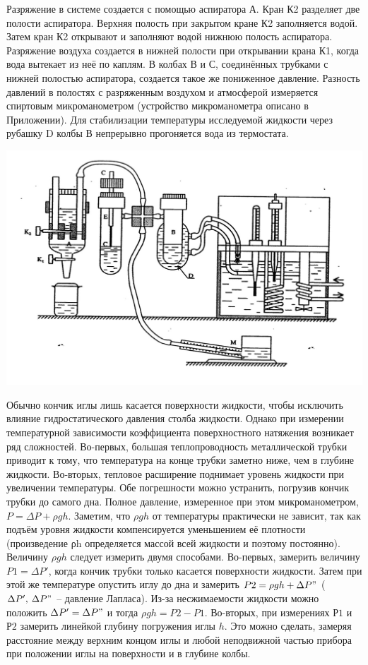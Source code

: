 \bigskip

Разряжение в системе создается с помощью аспиратора А. Кран К2 разделяет две полости аспиратора. Верхняя полость при закрытом кране К2  заполняется водой. Затем кран К2 открывают и заполняют водой  нижнюю полость  аспиратора.  Разряжение воздуха создается в нижней полости  при открывании крана К1, когда  вода вытекает из неё по каплям. В колбах В и С, соединённых трубками с нижней полостью аспиратора,  создается такое же пониженное давление. Разность давлений в полостях с разряженным воздухом и атмосферой измеряется спиртовым микроманометром (устройство микроманометра описано в Приложении). 
Для стабилизации температуры исследуемой жидкости через рубашку D колбы В непрерывно прогоняется вода из термостата.

\includegraphics[width=1\textwidth]{Scheme.jpg}

Обычно кончик иглы лишь касается поверхности жидкости, чтобы исключить влияние гидростатического давления столба жидкости. Однако при измерении температурной зависимости коэффициента поверхностного натяжения возникает ряд сложностей. Во-первых, большая теплопроводность металлической трубки приводит к тому, что температура на конце трубки заметно ниже, чем в глубине жидкости. Во-вторых, тепловое расширение поднимает уровень жидкости при увеличении температуры. 
Обе погрешности можно устранить, погрузив кончик трубки до самого дна. Полное давление, измеренное при этом микроманометром, $P = \Delta P + \rho gh$. Заметим, что $\rho gh$ от температуры практически не зависит, так как подъём уровня жидкости компенсируется уменьшением её плотности (произведение ρh определяется массой всей жидкости и поэтому постоянно). Величину  $\rho gh$ следует измерить двумя способами. Во-первых, замерить величину $P1 = \Delta P'$, когда кончик трубки только касается поверхности жидкости. Затем при этой же температуре опустить иглу до дна и замерить $P2 = \rho gh + \Delta P"$ ($\Delta P' ,\: \Delta P"$ – давление Лапласа). Из-за  несжимаемости  жидкости можно положить $\Delta P' = \Delta P"$ и тогда $\rho gh = P2 -P1$. Во-вторых, при измерениях $Р1$ и $Р2$ замерить линейкой  глубину погружения иглы $h$. Это можно сделать, замеряя расстояние между верхним концом иглы и любой неподвижной частью прибора при положении иглы на поверхности и в глубине колбы.

